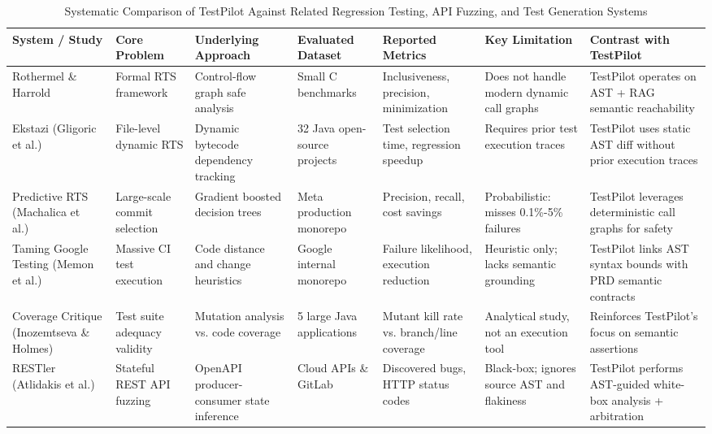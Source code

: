 \begin{table}[t]
\centering
\caption{Systematic Comparison of TestPilot Against Related Regression Testing, API Fuzzing, and Test Generation Systems}
\label{tab:related_work}
\scriptsize
\begin{tabular}{lp{2.2cm}p{2.8cm}p{2.4cm}p{2.2cm}p{2.2cm}p{2.5cm}}
\toprule
\textbf{System / Study} & \textbf{Core Problem} & \textbf{Underlying Approach} & \textbf{Evaluated Dataset} & \textbf{Reported Metrics} & \textbf{Key Limitation} & \textbf{Contrast with TestPilot} \\
\midrule
Rothermel \& Harrold~\cite{rothermel1996analyzing} & Formal RTS framework & Control-flow graph safe analysis & Small C benchmarks & Inclusiveness, precision, minimization & Does not handle modern dynamic call graphs & TestPilot operates on AST + RAG semantic reachability \\
\addlinespace
Ekstazi (Gligoric et al.)~\cite{gligoric2015practical} & File-level dynamic RTS & Dynamic bytecode dependency tracking & 32 Java open-source projects & Test selection time, regression speedup & Requires prior test execution traces & TestPilot uses static AST diff without prior execution traces \\
\addlinespace
Predictive RTS (Machalica et al.)~\cite{machalica2019predictive} & Large-scale commit selection & Gradient boosted decision trees & Meta production monorepo & Precision, recall, cost savings & Probabilistic: misses 0.1\%-5\% failures & TestPilot leverages deterministic call graphs for safety \\
\addlinespace
Taming Google Testing (Memon et al.)~\cite{memon2017taming} & Massive CI test execution & Code distance and change heuristics & Google internal monorepo & Failure likelihood, execution reduction & Heuristic only; lacks semantic grounding & TestPilot links AST syntax bounds with PRD semantic contracts \\
\addlinespace
Coverage Critique (Inozemtseva \& Holmes)~\cite{inozemtseva2014coverage} & Test suite adequacy validity & Mutation analysis vs. code coverage & 5 large Java applications & Mutant kill rate vs. branch/line coverage & Analytical study, not an execution tool & Reinforces TestPilot's focus on semantic assertions \\
\addlinespace
RESTler (Atlidakis et al.)~\cite{atlidakis2019restler} & Stateful REST API fuzzing & OpenAPI producer-consumer state inference & Cloud APIs \& GitLab & Discovered bugs, HTTP status codes & Black-box; ignores source AST and flakiness & TestPilot performs AST-guided white-box analysis + arbitration \\

\end{tabular}
\end{table}
